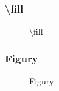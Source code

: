 \documentclass[10pt,t]{beamer}
\begin{document}
\begin{frame}
  \frametitle{\textbackslash fill}


  \begin{figure}

    \centering

    \begin{tikzpicture}





    \end{tikzpicture}


    \caption{\textbackslash fill}

  \end{figure}

\end{frame}





\begin{frame}
  \frametitle{Figury}


  \begin{figure}

    \centering

    \begin{tikzpicture}







    \end{tikzpicture}


    \caption{Figury}

  \end{figure}

\end{frame}
\end{document}
